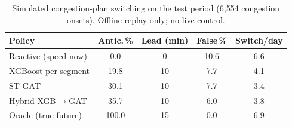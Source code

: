 \begin{table}[t]
\centering
\caption{Simulated congestion-plan switching on the test period (6,554 congestion onsets). Offline replay only; no live control.}
\label{tab:p2signal}
\setlength{\tabcolsep}{3.5pt}
\begin{tabular}{lcccc}
\toprule
Policy & Antic.\,\% & Lead (min) & False\,\% & Switch/day \\
\midrule
Reactive (speed now) & 0.0 & 0 & 10.6 & 6.6 \\
XGBoost per segment & 19.8 & 10 & 7.7 & 4.1 \\
ST-GAT & 30.1 & 10 & 7.7 & 3.4 \\
Hybrid XGB$\to$GAT & 35.7 & 10 & 6.0 & 3.8 \\
Oracle (true future) & 100.0 & 15 & 0.0 & 6.9 \\
\bottomrule
\end{tabular}
\end{table}